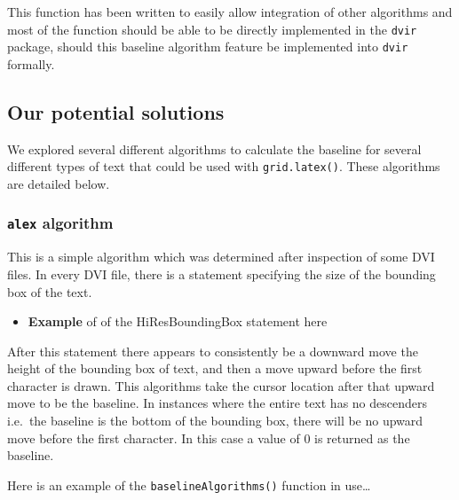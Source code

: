 \documentclass[]{article}
\newenvironment{Shaded}{\begin{snugshade}}{\end{snugshade}}
\newcommand{\KeywordTok}[1]{\textcolor[rgb]{0.13,0.29,0.53}{\textbf{#1}}}
\newcommand{\DataTypeTok}[1]{\textcolor[rgb]{0.13,0.29,0.53}{#1}}
\newcommand{\CharTok}[1]{\textcolor[rgb]{0.31,0.60,0.02}{#1}}
\newcommand{\StringTok}[1]{\textcolor[rgb]{0.31,0.60,0.02}{#1}}
\newcommand{\NormalTok}[1]{#1}
\providecommand{\tightlist}{%
  \setlength{\itemsep}{0pt}\setlength{\parskip}{0pt}}
\begin{document}
This function has been written to easily allow integration of other
algorithms and most of the function should be able to be directly
implemented in the \texttt{dvir} package, should this baseline algorithm
feature be implemented into \texttt{dvir} formally.

\subsection{Our potential solutions}\label{our-potential-solutions}

We explored several different algorithms to calculate the baseline for
several different types of text that could be used with
\texttt{grid.latex()}. These algorithms are detailed below.

\subsubsection{\texorpdfstring{\texttt{alex}
algorithm}{alex algorithm}}\label{alex-algorithm}

This is a simple algorithm which was determined after inspection of some
DVI files. In every DVI file, there is a statement specifying the size
of the bounding box of the text.

\begin{itemize}
\tightlist
\item
  \textbf{Example} of of the HiResBoundingBox statement here
\end{itemize}

After this statement there appears to consistently be a downward move
the height of the bounding box of text, and then a move upward before
the first character is drawn. This algorithms take the cursor location
after that upward move to be the baseline. In instances where the entire
text has no descenders i.e.~the baseline is the bottom of the bounding
box, there will be no upward move before the first character. In this
case a value of 0 is returned as the baseline.

Here is an example of the \texttt{baselineAlgorithms()} function in
use\ldots{}

\begin{Shaded}
\end{Shaded}
\end{document}

